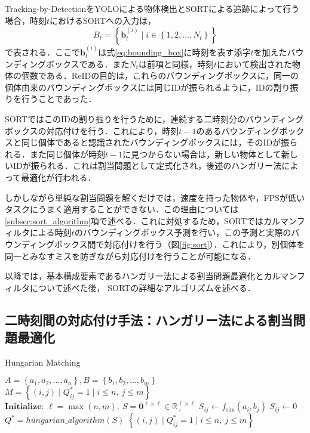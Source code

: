     Tracking-by-DetectionをYOLOによる物体検出とSORTによる追跡によって行う場合，時刻$t$におけるSORTへの入力は，
    \begin{equation}
        \label{eq:input_to_sort}
        B_t = \left\{\bm{b}_t^{(i)} \mid i \in \left\{1 ,2, \dots, N_t\right\}\right\}
    \end{equation}
    で表される．ここで$\bm{b}_t^{(i)}$は式\ref{eq:bounding_box}に時刻を表す添字$t$を加えたバウンディングボックスである．また$N_t$は前項と同様，時刻$t$において検出された物体の個数である．ReIDの目的は，これらのバウンディングボックスに，同一の個体由来のバウンディングボックスには同じIDが振られるように，IDの割り振りを行うことであった．

    SORTではこのIDの割り振りを行うために，連続する二時刻分のバウンディングボックスの対応付けを行う．これにより，時刻$t-1$のあるバウンディングボックスと同じ個体であると認識されたバウンディングボックスには，そのIDが振られる．また同じ個体が時刻$t-1$に見つからない場合は，新しい物体として新しいIDが振られる．これは割当問題として定式化され，後述のハンガリー法によって最適化が行われる．

    しかしながら単純な割当問題を解くだけでは，速度を持った物体や，FPSが低いタスクにうまく適用することができない．この理由については\ref{subsec:sort_algorithm}項で述べる．これに対処するため，SORTではカルマンフィルタによる時刻$t$のバウンディングボックス予測を行い，この予測と実際のバウンディングボックス間で対応付けを行う（図\ref{fig:sort}）．これにより，別個体を同一とみなすミスを防ぎながら対応付けを行うことが可能になる．

    以降では，基本構成要素であるハンガリー法による割当問題最適化とカルマンフィルタについて述べた後， SORTの詳細なアルゴリズムを述べる．

    \subsection{二時刻間の対応付け手法：ハンガリー法による割当問題最適化}
    \label{subsec:hungarian_algorithm}

    \begin{algorithm}[t]
        \caption{Hungarian Matching}
        \label{alg:hungarian_matching}
        \begin{algorithmic}[1]
            \Require $A = \left\{a_1, a_2, \dots, a_n\right\}, B = \left\{b_1, b_2, \dots, b_m\right\}$
            \Ensure $M = \left\{(i, j) \mid Q^*_{ij} = 1 \mid i \leq n , ~ j \leq m\right\}$
            \State $\textbf{Initialize: } \ell = \max(n, m), ~ S = \bm{0}^{\ell \times \ell} \in \mathbb{R}_+^{\ell \times \ell}$
                        \State $S_{ij} \gets f_{\text{sim}}(a_i, b_j)$
                    \Else
                        \State $S_{ij} \gets 0$
                    \EndIf
                \EndFor
            \EndFor
            \State $Q^* = hungarian\_algorithm(S)$
            \State \Return $\left\{(i, j) \mid Q^*_{ij} = 1 \mid i \leq n , ~ j \leq m\right\}$
        \end{algorithmic}
    \end{algorithm}

